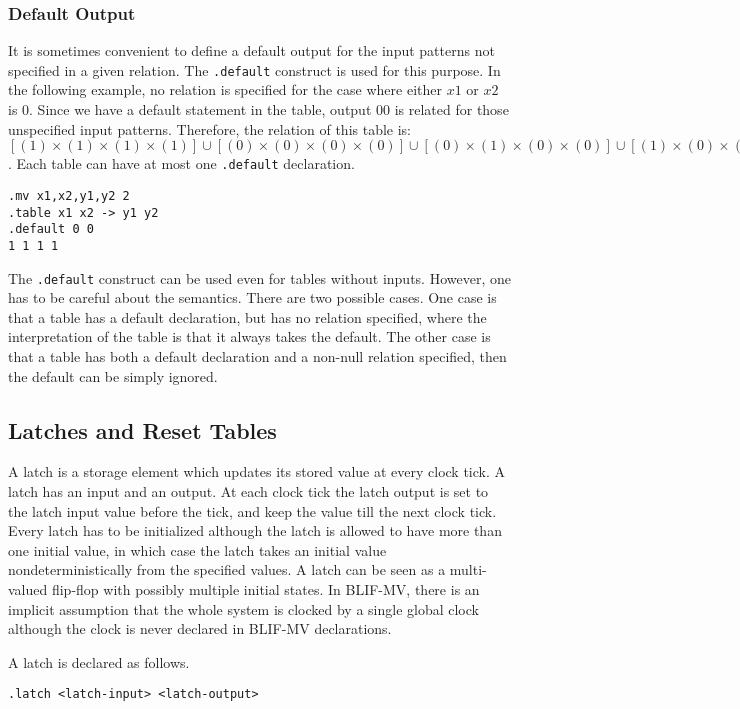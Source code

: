 \subsubsection{Default Output}
It is sometimes convenient to define
a default output for the input patterns
not specified in a given relation.
The {\tt .default} construct is used for this purpose.
In the following example,
no relation is specified for the case where either $x1$ or $x2$ is 0.
Since we have a default statement in the table,
output 00 is related for those unspecified input patterns.
Therefore, the relation of this table is:
$[(1) \times (1) \times (1) \times (1)] \cup
[(0) \times (0) \times (0) \times (0)] \cup
[(0) \times (1) \times (0) \times (0)] \cup
[(1) \times (0) \times (0) \times (0)]$.
Each table can have at most one {\tt .default} declaration.

\begin{verbatim}
.mv x1,x2,y1,y2 2
.table x1 x2 -> y1 y2
.default 0 0
1 1 1 1
\end{verbatim}

The {\tt .default} construct can be used
even for tables without inputs.
However, one has to be careful about the semantics.
There are two possible cases.
One case is that
a table has a default declaration, but has no relation specified,
where the interpretation of the table is that
it always takes the default.
The other case is
that a table has both a default declaration and a non-null relation
specified, then
the default can be simply ignored.

\subsection{Latches and Reset Tables}
A latch is a storage element
which updates its stored value
at every clock tick.
A latch has an input and an output.
At each clock tick
the latch output is set to the latch input value
before the tick, and keep the value till the next clock tick.
Every latch has to be initialized
although the latch is allowed to have more than one initial value,
in which case the latch takes an initial value
nondeterministically from the specified values.
A latch can be seen as a multi-valued flip-flop with possibly
multiple initial states.
In BLIF-MV, there is an implicit assumption
that the whole system is clocked by a single global clock
although the clock is never declared in BLIF-MV declarations.

A latch is declared as follows.

\begin{verbatim}
.latch <latch-input> <latch-output>
\end{verbatim}

